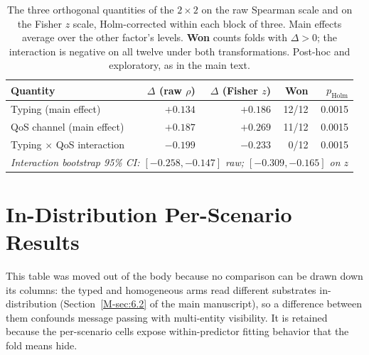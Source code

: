 \documentclass[preprint,3p]{elsarticle}
\begin{document}
\begin{table}[htbp]
\centering
\small
\caption{The three orthogonal quantities of the $2\times2$ on the raw Spearman
scale and on the Fisher $z$ scale, Holm-corrected within each block of three.
Main effects average over the other factor's levels. \textbf{Won} counts folds
with $\Delta > 0$; the interaction is negative on all twelve under both
transformations. Post-hoc and exploratory, as in the main text.}
\label{tab:contrasts_z}
\begin{tabular}{lrrrr}
\toprule
\textbf{Quantity} & \textbf{$\Delta$ (raw $\rho$)} & \textbf{$\Delta$ (Fisher $z$)} & \textbf{Won} & \textbf{$p_{\text{Holm}}$} \\
\midrule
Typing (main effect)          & $+0.134$ & $+0.186$ & 12/12 & 0.0015 \\
QoS channel (main effect)     & $+0.187$ & $+0.269$ & 11/12 & 0.0015 \\
Typing $\times$ QoS interaction & $-0.199$ & $-0.233$ & 0/12 & 0.0015 \\
\midrule
\multicolumn{5}{l}{\textit{Interaction bootstrap 95\% CI: $[-0.258, -0.147]$ raw; $[-0.309, -0.165]$ on $z$}} \\
\bottomrule
\end{tabular}
\end{table}

\section{In-Distribution Per-Scenario Results}
\label{supp:indist-table}

This table was moved out of the body because no comparison can be drawn down its columns: the typed and homogeneous arms read different substrates in-distribution (Section~\ref{M-sec:6.2} of the main manuscript), so a difference between them confounds message passing with multi-entity visibility. It is retained because the per-scenario cells expose within-predictor fitting behavior that the fold means hide.
\end{document}
